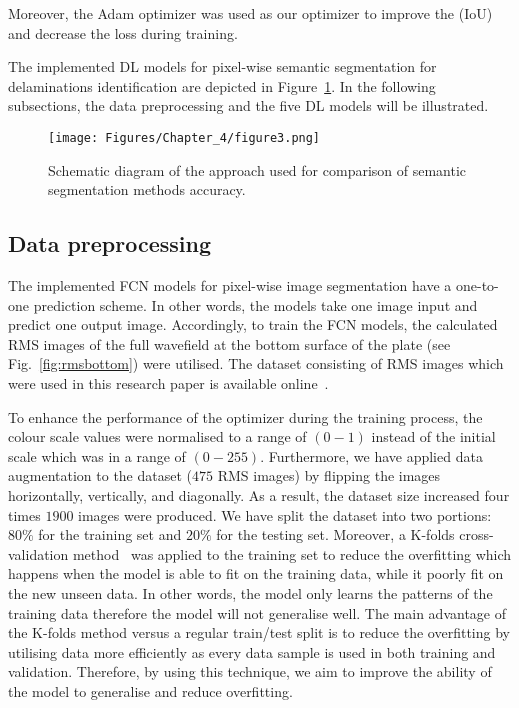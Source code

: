 Moreover, the Adam optimizer was used as our optimizer to improve the (IoU) and decrease the loss during training.

The implemented DL models for pixel-wise semantic segmentation for delaminations identification are depicted in Figure~\ref{fig:flowchart}.
In the following subsections, the data preprocessing and the five DL models will be illustrated.
\begin{figure} [h!]
	\begin{center}
		\texttt{[image: Figures/Chapter\_4/figure3.png]}
	\end{center}
	\caption{Schematic diagram of the approach used for comparison of semantic segmentation methods accuracy.} 
	\label{fig:flowchart}
\end{figure}
\subsection{Data preprocessing}
The implemented FCN models for pixel-wise image segmentation have a one-to-one prediction scheme.
In other words, the models take one image input and predict one output image.
Accordingly, to train the FCN models, the calculated RMS images of the full wavefield at the bottom surface of the plate (see Fig.~\ref{fig:rmsbottom}) were utilised.
The dataset consisting of RMS images which were used in this research paper is available online~\cite{Kudela2020d}.

To enhance the performance of the optimizer during the training process, the colour scale values were normalised to a range of \((0-1)\) instead of the initial scale which was in a range of \((0-255)\). 
Furthermore, we have applied data augmentation to the dataset (\(475\) RMS images) by flipping the images horizontally, vertically, and diagonally. 
As a result, the dataset size increased four times \(1900\) images were produced. 
We have split the dataset into two portions: \(80\%\) for the training set and \(20\%\) for the testing set. 
Moreover, a K-folds cross-validation method~\cite{Srinivasan2019} was applied to the training set to reduce the overfitting which happens when the model is able to fit on the training data, while it poorly fit on the new unseen data. 
In other words, the model only learns the patterns of the training data therefore the model will not generalise well. 
The main advantage of the K-folds method versus a regular train/test split is to reduce the overfitting by utilising data more efficiently as every data sample is used in both training and validation. 
Therefore, by using this technique, we aim to improve the ability of the model to generalise and reduce overfitting.
